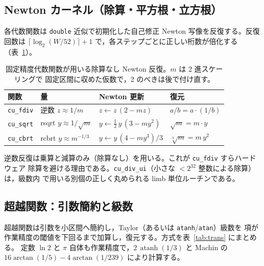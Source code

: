 \documentclass[uplatex,dvipdfmx,a4paper,11pt]{jsarticle}
\newcommand{\code}[1]{\texttt{#1}}
\begin{document}
\subsection{Newton カーネル（除算・平方根・立方根）}
各代数関数は \code{double} 近似で初期化した自己修正 Newton 写像を反復する。反復回数は
$\lceil\log_2(W/52)\rceil+1$ で，各ステップごとに正しい桁数が倍化する
（表~\ref{tab:newton}）。

\begin{table}[h]
\centering
\begin{tabular}{@{}llll@{}}
\toprule
関数 & 量 & Newton 更新 & 復元\\
\midrule
\code{cu\_fdiv}  & 逆数 $z\!\approx\!1/m$ & $z \leftarrow z\,(2 - m z)$ & $a/b = a\cdot(1/b)$\\
\code{cu\_sqrt}  & rsqrt $y\!\approx\!1/\sqrt m$ & $y \leftarrow \tfrac{1}{2}\,y\,(3 - m y^2)$ & $\sqrt m = m\cdot y$\\
\code{cu\_cbrt}  & rcbrt $y\!\approx\!m^{-1/3}$ & $y \leftarrow y\,(4 - m y^3)/3$ & $\sqrt[3]{m}=m\,y^2$\\
\bottomrule
\end{tabular}
\caption{固定精度代数関数が用いる除算なし Newton 反復。$m$ は 2 進スケーリングで
固定区間に収めた仮数で，2 のべきは後で付け直す。}
\label{tab:newton}
\end{table}

逆数反復は乗算と減算のみ（除算なし）を用いる。これが \code{cu\_fdiv} すらハードウェア
除算を避ける理由である。\code{cu\_div\_ui}（小さな $<2^{32}$ 整数による除算）は，級数内
で用いる別個の正しく丸められる limb 単位ルーチンである。

\subsection{超越関数：引数簡約と級数}
超越関数は引数を小区間へ簡約し，Taylor（あるいは \code{atanh}/\code{atan}）級数を
項が作業精度の閾値を下回るまで加算し，復元する。方式を表~\ref{tab:trans} にまとめる。
定数 $\ln 2$ と $\pi$ 自体も作業精度で，$2\,\operatorname{atanh}(1/3)$ と Machin の
$16\arctan(1/5)-4\arctan(1/239)$ により計算する。
\end{document}
